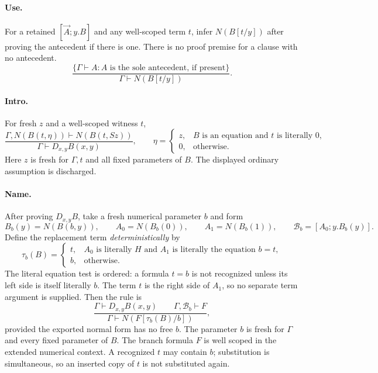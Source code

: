 \paragraph{Use.}
For a retained $[\vec A;y.B]$ and any well-scoped term $t$, infer $N(B[t/y])$
after proving the antecedent if there is one. There is no proof premise
for a clause with no antecedent.
\[
 \frac{\{\Gamma\vdash A:A\text{ is the sole antecedent, if present}\}}
      {\Gamma\vdash N(B[t/y])}.
 \tag{Use}
\]

\paragraph{Intro.}
For fresh $z$ and a well-scoped witness $t$,
\[
 \frac{\Gamma,N(B(t,\eta))\vdash N(B(t,Sz))}
      {\Gamma\vdash D_{x,y}B(x,y)},
 \qquad
 \eta=\begin{cases}
 z,& B\text{ is an equation and }t\text{ is literally }0,\\
 0,&\text{otherwise}.
 \end{cases}
 \tag{Intro}
\]
Here $z$ is fresh for $\Gamma,t$ and all fixed parameters of $B$.
The displayed ordinary assumption is discharged.

\paragraph{Name.}
After proving $D_{x,y}B$, take a fresh numerical parameter $b$ and form
\[
 B_b(y)=N(B(b,y)),\qquad
 A_0=N(B_b(0)),\qquad A_1=N(B_b(1)),
 \qquad \mathcal B_b=[A_0;y.B_b(y)].
\]
Define the replacement term \emph{deterministically} by
\[
 \tau_b(B)=
 \begin{cases}
 t,& A_0\text{ is literally }H\text{ and }A_1
       \text{ is literally the equation }b=t,\\
 b,&\text{otherwise}.
 \end{cases}
 \tag{First-instance test}\label{eq:first-instance-test}
\]
The literal equation test is ordered: a formula $t=b$ is not recognized
unless its left side is itself literally $b$. The term $t$ is the right
side of $A_1$, so no separate term argument is supplied. Then the rule is
\[
 \frac{\Gamma\vdash D_{x,y}B(x,y)\qquad
       \Gamma,\mathcal B_b\vdash F}
      {\Gamma\vdash N(F[\tau_b(B)/b])},
 \tag{Name}\label{eq:deterministic-name}
\]
provided the exported normal form has no free $b$. The parameter $b$ is
fresh for $\Gamma$ and every fixed parameter of $B$. The branch formula
$F$ is well scoped in the extended numerical context. A recognized $t$
may contain $b$; substitution is simultaneous, so an inserted copy of $t$
is not substituted again.

